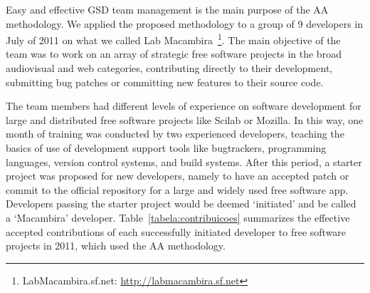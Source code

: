 \documentclass[letterpaper]{article}
\begin{document}
Easy and effective GSD team management is the main
purpose of the AA methodology. We applied the proposed methodology to a group
of 9 developers in July of 2011 on what we called Lab
Macambira~\footnote{LabMacambira.sf.net: \url{http://labmacambira.sf.net}}. The
main objective of the team was to work on an array of strategic free software
projects in the broad audiovisual and web categories,
contributing directly to their development, submitting bug patches or
committing new features to their source code.

The team members had different levels of experience on software
development for large and distributed free software projects
like Scilab or Mozilla. In this way, one month of training was
conducted by two experienced developers, teaching the basics of use of
development support tools like bugtrackers, programming languages,
version control systems, and build systems. After this period, a starter project
was proposed for new developers, namely to have an accepted patch or commit to
the official repository for a large and widely used free software app.
Developers passing the starter project would be deemed `initiated' and be
called a `Macambira' developer.  Table~\ref{tabela:contribuicoes} summarizes the
effective accepted contributions of each successfully initiated developer to
free software projects in 2011, which used the AA methodology.

\end{document}
